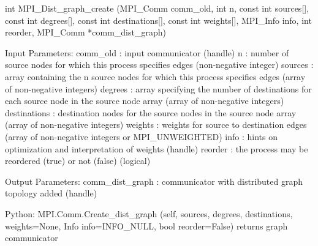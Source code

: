 int MPI_Dist_graph_create
   (MPI_Comm comm_old, int n, const int sources[],
    const int degrees[], const int destinations[], const int weights[],
    MPI_Info info, int reorder,
    MPI_Comm *comm_dist_graph)

Input Parameters:
comm_old : input communicator (handle)
n : number of source nodes for which this process specifies edges (non-negative integer)
sources : array containing the n source nodes for which this process specifies edges (array of non-negative integers)
degrees : array specifying the number of destinations for each source node in the source node array (array of non-negative integers)
destinations : destination nodes for the source nodes in the source
node array (array of
non-negative
integers)
weights : weights for source to destination edges (array of
non-negative integers or MPI_UNWEIGHTED)
info : hints on optimization and interpretation of weights (handle)
reorder : the process may be reordered (true) or not (false) (logical)

Output Parameters:
comm_dist_graph : communicator with distributed graph topology added (handle)

Python:
MPI.Comm.Create_dist_graph
    (self, sources, degrees, destinations, weights=None, Info info=INFO_NULL, bool reorder=False)
returns graph communicator
